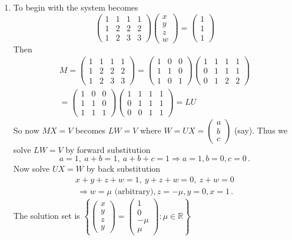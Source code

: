\begin{enumerate}
\item To begin with the system becomes
\[
\begin{pmatrix}1&1&1&1\\[1mm]1&2&2&2\\[1mm]1&2&3&3
\end{pmatrix}
\begin{pmatrix}x\\[1mm]y\\[1mm]z\\[1mm]w\end{pmatrix}=
\begin{pmatrix}1\\[1mm]1\\[1mm]1\end{pmatrix}
\]
Then
\begin{gather*}
M=
\begin{pmatrix}
1&1&1&1\\[1mm]1&2&2&2\\[1mm]1&2&3&3
\end{pmatrix}
=
\begin{pmatrix}
1&0&0\\[1mm]1&1&0\\[1mm]1&0&1
\end{pmatrix}
\begin{pmatrix}
1&1&1&1\\[1mm]0&1&1&1\\[1mm]0&1&2&2
\end{pmatrix}\\
=
\begin{pmatrix}
1&0&0\\[1mm]1&1&0\\[1mm]1&1&1
\end{pmatrix}
\begin{pmatrix}
1&1&1&1\\[1mm]0&1&1&1\\[1mm]0&0&1&1
\end{pmatrix}=LU
\end{gather*}
So now $MX=V$ becomes $LW=V$ where $W=UX=\begin{pmatrix}a\\b\\c\end{pmatrix}$ (say). Thus we solve $LW=V$ by forward substitution
\[
a=1,\ a+b=1,  \ a+b+c=1 \Rightarrow a=1,b=0,c=0\, .
\]
Now solve $UX=W$ by back substitution
\begin{gather*}
x+y+z+w=1, \ y+z+w=0, \ z + w =0\\ \ \Rightarrow
w=\mu \mbox{ (arbitrary)}, z=-\mu, y=0, x=1\, .
\end{gather*}
The solution set is $\left\{\begin{pmatrix}x\\y\\z\\y\end{pmatrix}=\begin{pmatrix}1\\0\\-\mu\\\mu\end{pmatrix}: \mu\in {\mathbb R}\right\}$



\end{enumerate}
